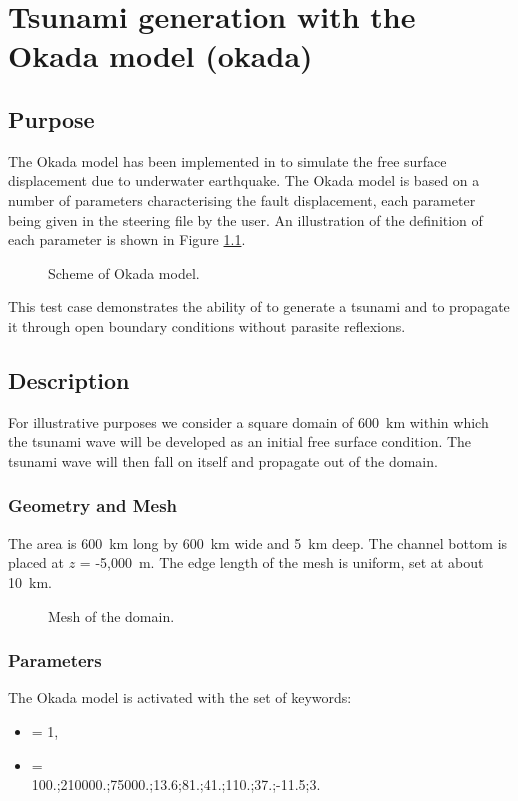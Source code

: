 \chapter{Tsunami generation with the Okada model (okada)}

\section{Purpose}
The Okada model \cite{Okada1985} has been implemented in  to
simulate the free surface displacement due to underwater earthquake.
The Okada model is based on a number of parameters characterising the fault
displacement, each parameter being given in the steering file by the user.
An illustration of the definition of each parameter is shown in Figure
\ref{fig:okada:scheme}.

\begin{figure}[H]
\centering
{}
\caption{Scheme of Okada model.}\label{fig:okada:scheme}
\end{figure}

This test case demonstrates the ability of  to generate a tsunami
and to propagate it through open boundary conditions without parasite reflexions.

\section{Description}
For illustrative purposes we consider a square domain of 600~km within which the
tsunami wave will be developed as an initial free surface condition.
The tsunami wave will then fall on itself and propagate out of the domain.

\subsection{Geometry and Mesh}
The area is 600~km long by 600~km wide and 5~km deep.
The channel bottom is placed at $z$ = -5,000~m.
The edge length of the mesh is uniform, set at about 10~km.

\begin{figure}
\centering
{}
\caption{Mesh of the domain.}\label{fig:okada:mesh}
\end{figure}

\subsection{Parameters}
The Okada model is activated with the set of keywords:
\begin{itemize}
\item {} = 1,
\item {} =\\
100.;210000.;75000.;13.6;81.;41.;110.;37.;-11.5;3.
\end{itemize}

